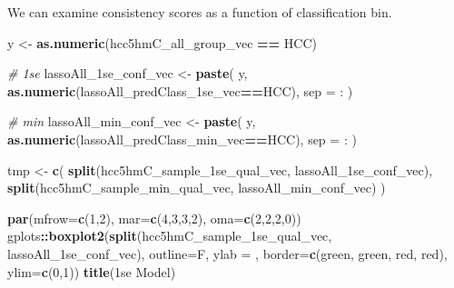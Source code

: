 \documentclass[
]{book}
\newenvironment{Shaded}{\begin{snugshade}}{\end{snugshade}}
\newcommand{\CommentTok}[1]{\textcolor[rgb]{0.56,0.35,0.01}{\textit{#1}}}
\newcommand{\DataTypeTok}[1]{\textcolor[rgb]{0.13,0.29,0.53}{#1}}
\newcommand{\DecValTok}[1]{\textcolor[rgb]{0.00,0.00,0.81}{#1}}
\newcommand{\KeywordTok}[1]{\textcolor[rgb]{0.13,0.29,0.53}{\textbf{#1}}}
\newcommand{\NormalTok}[1]{#1}
\newcommand{\OperatorTok}[1]{\textcolor[rgb]{0.81,0.36,0.00}{\textbf{#1}}}
\newcommand{\StringTok}[1]{\textcolor[rgb]{0.31,0.60,0.02}{#1}}
\begin{document}
We can examine consistency scores as a function of classification bin.

\begin{Shaded}
\begin{Highlighting}[]
\NormalTok{y <{-}}\StringTok{ }\KeywordTok{as.numeric}\NormalTok{(hcc5hmC\_all\_group\_vec }\OperatorTok{==}\StringTok{ \textquotesingle{}HCC\textquotesingle{}}\NormalTok{)}

\CommentTok{\# 1se}
\NormalTok{lassoAll\_1se\_conf\_vec <{-}}\StringTok{ }\KeywordTok{paste}\NormalTok{(}
\NormalTok{ y, }
 \KeywordTok{as.numeric}\NormalTok{(lassoAll\_predClass\_1se\_vec}\OperatorTok{==}\StringTok{\textquotesingle{}HCC\textquotesingle{}}\NormalTok{),}
 \DataTypeTok{sep =} \StringTok{\textquotesingle{}:\textquotesingle{}}
\NormalTok{)}

\CommentTok{\# min}
\NormalTok{lassoAll\_min\_conf\_vec <{-}}\StringTok{ }\KeywordTok{paste}\NormalTok{(}
\NormalTok{ y, }
 \KeywordTok{as.numeric}\NormalTok{(lassoAll\_predClass\_min\_vec}\OperatorTok{==}\StringTok{\textquotesingle{}HCC\textquotesingle{}}\NormalTok{),}
 \DataTypeTok{sep =} \StringTok{\textquotesingle{}:\textquotesingle{}}
\NormalTok{)}


\NormalTok{tmp <{-}}\StringTok{ }\KeywordTok{c}\NormalTok{(}
 \KeywordTok{split}\NormalTok{(hcc5hmC\_sample\_1se\_qual\_vec, lassoAll\_1se\_conf\_vec), }
 \KeywordTok{split}\NormalTok{(hcc5hmC\_sample\_min\_qual\_vec, lassoAll\_min\_conf\_vec)}
\NormalTok{)}

\KeywordTok{par}\NormalTok{(}\DataTypeTok{mfrow=}\KeywordTok{c}\NormalTok{(}\DecValTok{1}\NormalTok{,}\DecValTok{2}\NormalTok{), }\DataTypeTok{mar=}\KeywordTok{c}\NormalTok{(}\DecValTok{4}\NormalTok{,}\DecValTok{3}\NormalTok{,}\DecValTok{3}\NormalTok{,}\DecValTok{2}\NormalTok{), }\DataTypeTok{oma=}\KeywordTok{c}\NormalTok{(}\DecValTok{2}\NormalTok{,}\DecValTok{2}\NormalTok{,}\DecValTok{2}\NormalTok{,}\DecValTok{0}\NormalTok{))}
\NormalTok{gplots}\OperatorTok{::}\KeywordTok{boxplot2}\NormalTok{(}\KeywordTok{split}\NormalTok{(hcc5hmC\_sample\_1se\_qual\_vec, lassoAll\_1se\_conf\_vec), }
  \DataTypeTok{outline=}\NormalTok{F, }\DataTypeTok{ylab =} \StringTok{\textquotesingle{}\textquotesingle{}}\NormalTok{, }
  \DataTypeTok{border=}\KeywordTok{c}\NormalTok{(}\StringTok{\textquotesingle{}green\textquotesingle{}}\NormalTok{, }\StringTok{\textquotesingle{}green\textquotesingle{}}\NormalTok{, }\StringTok{\textquotesingle{}red\textquotesingle{}}\NormalTok{, }\StringTok{\textquotesingle{}red\textquotesingle{}}\NormalTok{),}
  \DataTypeTok{ylim=}\KeywordTok{c}\NormalTok{(}\DecValTok{0}\NormalTok{,}\DecValTok{1}\NormalTok{))}
\KeywordTok{title}\NormalTok{(}\StringTok{\textquotesingle{}1se Model\textquotesingle{}}\NormalTok{)}


\end{Highlighting}
\end{Shaded}
\end{document}
